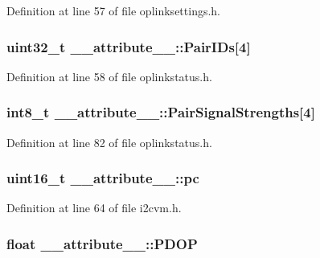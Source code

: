 \-Definition at line 57 of file oplinksettings.\-h.

\hypertarget{struct____attribute_____a23c4dff2c8f1143f2b8181c46090a308}{
\subsubsection[{\-Pair\-I\-Ds}]{\setlength{\rightskip}{0pt plus 5cm}uint32\-\_\-t {\bf \-\_\-\-\_\-attribute\-\_\-\-\_\-\-::\-Pair\-I\-Ds}\mbox{[}4\mbox{]}}}\label{struct____attribute_____a23c4dff2c8f1143f2b8181c46090a308}


\-Definition at line 58 of file oplinkstatus.\-h.

\hypertarget{struct____attribute_____a27ae0bcfc8859e683c66641a90d64906}{
\subsubsection[{\-Pair\-Signal\-Strengths}]{\setlength{\rightskip}{0pt plus 5cm}int8\-\_\-t {\bf \-\_\-\-\_\-attribute\-\_\-\-\_\-\-::\-Pair\-Signal\-Strengths}\mbox{[}4\mbox{]}}}\label{struct____attribute_____a27ae0bcfc8859e683c66641a90d64906}


\-Definition at line 82 of file oplinkstatus.\-h.

\hypertarget{struct____attribute_____acd1448632ff255cc162c89177dabd24d}{
\subsubsection[{pc}]{\setlength{\rightskip}{0pt plus 5cm}uint16\-\_\-t {\bf \-\_\-\-\_\-attribute\-\_\-\-\_\-\-::pc}}}\label{struct____attribute_____acd1448632ff255cc162c89177dabd24d}


\-Definition at line 64 of file i2cvm.\-h.

\hypertarget{struct____attribute_____af13bd232120103c70e82ac674c3bf0ac}{
\subsubsection[{\-P\-D\-O\-P}]{\setlength{\rightskip}{0pt plus 5cm}float {\bf \-\_\-\-\_\-attribute\-\_\-\-\_\-\-::\-P\-D\-O\-P}}}\label{struct____attribute_____af13bd232120103c70e82ac674c3bf0ac}


